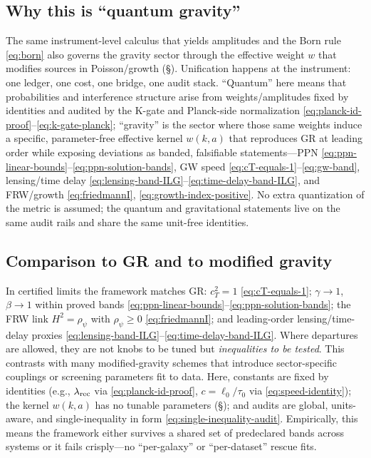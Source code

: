 \documentclass[12pt,a4paper]{article}
\begin{document}
\subsection{Why this is ``quantum gravity''}
The same instrument-level calculus that yields amplitudes and the Born rule \eqref{eq:born} also governs the gravity sector through the effective weight \(w\) that modifies sources in Poisson/growth (\S{}). Unification happens at the instrument: one ledger, one cost, one bridge, one audit stack. “Quantum” here means that probabilities and interference structure arise from weights/amplitudes fixed by identities and audited by the K-gate and Planck-side normalization \eqref{eq:planck-id-proof}–\eqref{eq:k-gate-planck}; “gravity” is the sector where those same weights induce a specific, parameter-free effective kernel \(w(k,a)\) that reproduces GR at leading order while exposing deviations as banded, falsifiable statements—PPN \eqref{eq:ppn-linear-bounds}–\eqref{eq:ppn-solution-bands}, GW speed \eqref{eq:cT-equals-1}–\eqref{eq:gw-band}, lensing/time delay \eqref{eq:lensing-band-ILG}–\eqref{eq:time-delay-band-ILG}, and FRW/growth \eqref{eq:friedmannI}, \eqref{eq:growth-index-positive}. No extra quantization of the metric is assumed; the quantum and gravitational statements live on the same audit rails and share the same unit-free identities.

\subsection{Comparison to GR and to modified gravity}
In certified limits the framework matches GR: \(c_T^2=1\) \eqref{eq:cT-equals-1}; \(\gamma\to1\), \(\beta\to1\) within proved bands \eqref{eq:ppn-linear-bounds}–\eqref{eq:ppn-solution-bands}; the FRW link \(H^2=\rho_\psi\) with \(\rho_\psi\ge 0\) \eqref{eq:friedmannI}; and leading-order lensing/time-delay proxies \eqref{eq:lensing-band-ILG}–\eqref{eq:time-delay-band-ILG}. Where departures are allowed, they are not knobs to be tuned but \emph{inequalities to be tested}. This contrasts with many modified-gravity schemes that introduce sector-specific couplings or screening parameters fit to data. Here, constants are fixed by identities (e.g., \(\lambda_{\rm rec}\) via \eqref{eq:planck-id-proof}, \(c=\ell_0/\tau_0\) via \eqref{eq:speed-identity}); the kernel \(w(k,a)\) has no tunable parameters (\S{}); and audits are global, units-aware, and single-inequality in form \eqref{eq:single-inequality-audit}. Empirically, this means the framework either survives a shared set of predeclared bands across systems or it fails crisply—no “per-galaxy” or “per-dataset” rescue fits.
\end{document}

